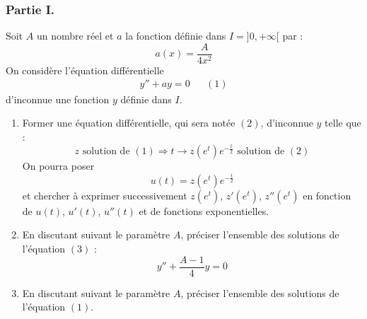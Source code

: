 \subsubsection*{Partie I.}
Soit $A$ un nombre réel et $a$ la fonction définie dans $I=]0,+\infty[$ par :
\begin{displaymath}
 a(x)=\dfrac{A}{4x^2}
\end{displaymath}
On considère l'équation différentielle
\begin{align*}
 y''+ay = 0 & & (1)
\end{align*}
d'inconnue une fonction $y$ définie dans $I$.
\begin{enumerate}
 \item Former une équation différentielle, qui sera notée $(2)$, d'inconnue $y$ telle que :
\begin{displaymath}
 z \text{ solution de } (1) \Rightarrow t\rightarrow z(e^t)e^{-\frac{t}{2}} \text{ solution de } (2)
\end{displaymath}
On pourra poser 
\begin{displaymath}
 u(t)=z(e^t)e^{-\frac{t}{2}}
\end{displaymath}
 et chercher à exprimer successivement $z(e^t)$, $z'(e^t)$, $z''(e^t)$ en fonction de $u(t)$, $u'(t)$, $u''(t)$ et de fonctions exponentielles.
\item En discutant suivant le paramètre $A$, préciser l'ensemble des solutions de l'équation $(3)$ :
\begin{displaymath}
 y'' + \dfrac{A-1}{4}y = 0
\end{displaymath}
\item En discutant suivant le paramètre $A$, préciser l'ensemble des solutions de l'équation $(1)$.
\end{enumerate}
